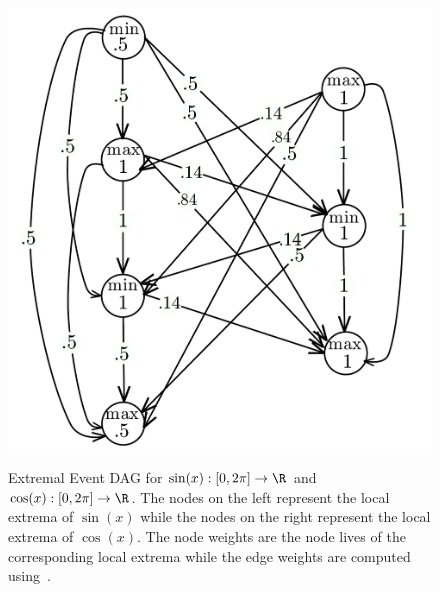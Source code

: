 \begin{example}
    \begin{figure}[htp]
        \centering
        {\includegraphics[width=.4\textwidth]{images/sine-unnormal.pdf}}
        \caption{Extremal Event DAG for $\sin(x):[0,2\pi]\rightarrow \R$ and $\cos(x):[0,2\pi]\rightarrow \R$.
        The nodes on the left represent the local extrema of $\sin(x)$ while the nodes on the right
        represent the local extrema of $\cos(x)$. The node weights are the node lives of the corresponding
        local extrema while the edge weights are computed using~.}
        \label{fig:extremalDAGsine}
    \end{figure}
\end{example}
